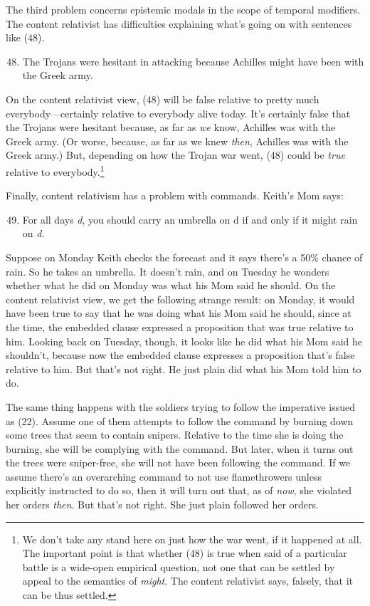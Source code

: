 The third problem concerns epistemic modals in the scope of temporal modifiers. The content relativist has difficulties explaining what's going on with sentences like (48).
 
\begin{enumerate}
\setcounter{enumi}{47} 
\item The Trojans were hesitant in attacking because Achilles might have been with the Greek army.
\end{enumerate}

\noindent On the content relativist view, (48) will be false relative to pretty much everybody---certainly relative to everybody alive today. It's certainly false that the Trojans were hesitant because, as far as \textit{we} know, Achilles was with the Greek army. (Or worse, because, as far as we knew \textit{then}, Achilles was with the Greek army.) But, depending on how the Trojan war went, (48) could be \textit{true} relative to everybody.\footnote{We don't take any stand here on just how the war went, if it happened at all. The important point is that whether (48) is true when said of a particular battle is a wide-open empirical question, not one that can be settled by appeal to the semantics of \textit{might}. The content relativist says, falsely, that it can be thus settled.}
 
Finally, content relativism has a problem with commands. Keith's Mom says:
 
\begin{enumerate}
\setcounter{enumi}{48} 
\item For all days \textit{d}, you should carry an umbrella on d if and only if it might rain on \textit{d}.
\end{enumerate}

\noindent Suppose on Monday Keith checks the forecast and it says there's a 50\% chance of rain. So he takes an umbrella. It doesn't rain, and on Tuesday he wonders whether what he did on Monday was what his Mom said he should. On the content relativist view, we get the following strange result: on Monday, it would have been true to say that he was doing what his Mom said he should, since at the time, the embedded clause expressed a proposition that was true relative to him. Looking back on Tuesday, though, it looks like he did what his Mom said he shouldn't, because now the embedded clause expresses a proposition that's false relative to him. But that's not right. He just plain did what his Mom told him to do.
 
The same thing happens with the soldiers trying to follow the imperative issued as (22). Assume one of them attempts to follow the command by burning down some trees that seem to contain snipers. Relative to the time she is doing the burning, she will be complying with the command. But later, when it turns out the trees were sniper-free, she will not have been following the command. If we assume there's an overarching command to not use flamethrowers unless explicitly instructed to do so, then it will turn out that, as of \textit{now}, she violated her orders \textit{then}. But that's not right. She just plain followed her orders.
 
